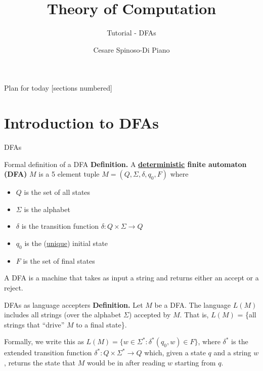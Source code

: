 \documentclass[10pt]{beamer}
\title{Theory of Computation}
\subtitle{Tutorial - DFAs}
\author{Cesare Spinoso-Di Piano}
\date{}
\begin{document}
\maketitle

\begin{frame}{Plan for today}
    [sections numbered]
    \tableofcontents[hideallsubsections]
\end{frame}

\section{Introduction to DFAs}

\begin{frame}{DFAs}

\end{frame}


\begin{frame}[t]{Formal definition of a DFA}
    \textbf{Definition.} A \textbf{\underline{deterministic} finite automaton (DFA)} $M$ is a 5 element tuple $M = (Q, \Sigma, \delta, q_0, F)$ where
    \begin{itemize}
        \item $Q$ is the set of all states
        \item $\Sigma$ is the alphabet
        \item $\delta$ is the transition function $\delta: Q \times \Sigma \rightarrow Q$
        \item $q_0$ is the (\underline{unique}) initial state
        \item $F$ is the set of final states
    \end{itemize}
    A DFA is a machine that takes as input a string and returns either an accept or a reject.
\end{frame}


\begin{frame}{DFAs as language accepters}
    \textbf{Definition.} Let $M$ be a DFA. The language $L(M)$ includes all strings (over the alphabet $\Sigma$) accepted by $M$. That is, $L(M)$ = \{all strings that ``drive'' $M$ to a final state\}. 

    Formally, we write this as $L(M) = \{w \in \Sigma ^*: \delta ^*(q_0,w)\in F\}$, where $\delta^*$ is the extended transition function $\delta ^*: Q\times \Sigma ^*\rightarrow Q$ which, given a state $q$ and a string $w$, returns the state that $M$ would be in after reading $w$ starting from $q$.
\end{frame}
\end{document}
